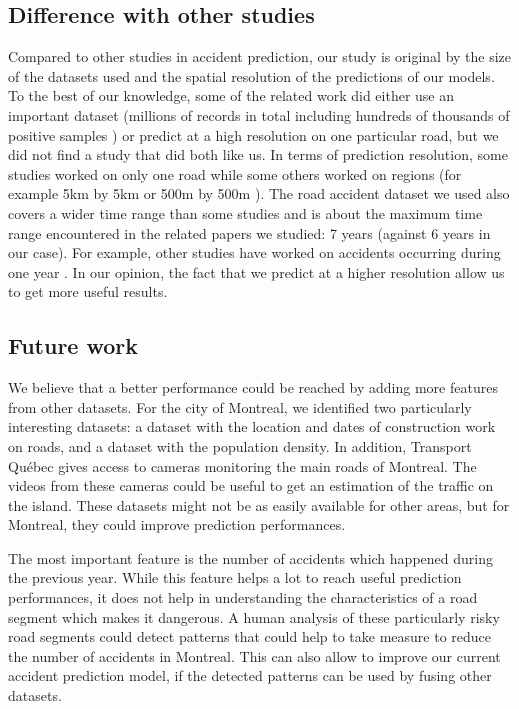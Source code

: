 \documentclass[conference]{IEEEtran}
\begin{document}

\subsection{Difference with other studies}

Compared to other studies in accident prediction, our study is original by the size of the datasets used and the spatial resolution of the predictions of our models. To the best of our knowledge, some of the related work did either use an important dataset (millions of records in total including hundreds of thousands of positive samples \cite{QChen2016}) or predict at a high resolution on one particular road, but we did not find a study that did both like us. In terms of prediction resolution, some studies worked on only one road \cite{Chang2005} \cite{Chang2005b} \cite{Lin2015} while some others worked on regions (for example 5km by 5km \cite{QChen2016} or 500m by 500m \cite{Yuan2018}). The road accident dataset we used also covers a wider time range than some studies and is about the maximum time range encountered in the related papers we studied: 7 years \cite{Yuan2018} (against 6 years in our case). For example, other studies have worked on accidents occurring during one year \cite{Chang2005} \cite{Chang2005b} \cite{QChen2016} \cite{Lin2015}. In our opinion, the fact that we predict at a higher resolution allow us to get more useful results.


\subsection{Future work}

We believe that a better performance could be reached by adding more features
from other datasets. For the city of Montreal, we identified two
particularly interesting datasets: a dataset with the location and dates of
construction work on roads, and a dataset with the population density.
In addition, Transport Qu\'ebec gives access to cameras monitoring the main
roads of Montreal. The videos from these cameras could be useful to get an
estimation of the traffic on the island. These datasets might not be as
easily available for other areas, but for Montreal, they could improve 
prediction performances.

The most important feature is the number of accidents which happened during
the previous year. While this feature helps a lot to reach useful prediction
performances, it does not help in understanding the characteristics of a
road segment which makes it dangerous. A human analysis of these
particularly risky road segments could detect patterns that could help to
take measure to reduce the number of accidents in Montreal. This can also
allow to improve our current accident prediction model, if the detected
patterns can be used by fusing other datasets.
\end{document}
